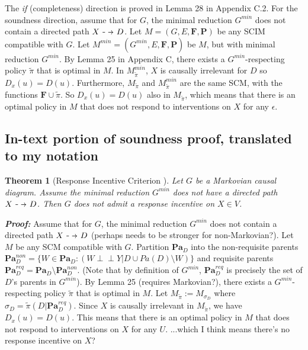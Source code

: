 \documentclass[letterpaper,10pt]{article}
\newtheorem{theorem}{Theorem}
\newcommand\dashto{\mathrel{
  -\mkern-6mu{\to}\mkern-20mu{\color{white}\bullet}\mkern12mu
}}
\newcommand\indep{\perp \!\!\! \perp}
\begin{document}
The \emph{if} (completeness) direction is proved in  Lemma 28 in Appendix C.2. For the soundness direction, assume that for $G$, the minimal reduction $G^{min}$ does not contain a directed path $X\dashto D$. Let $M=(G,E,\mathbf{F},\mathbf{P})$ be any SCIM compatible with $G$. Let $M^{min}=(G^{min},E,\mathbf{F},\mathbf{P})$ be $M$, but with minimal reduction $G^{min}$. By Lemma 25 in Appendix C, there exists a $G^{min}$-respecting policy $\tilde{\pi}$ that is optimal in $M$. In $M^{min}_{\tilde{\pi}}$, $X$ is causally irrelevant for $D$ so $D_x(u) = D(u)$. Furthermore, $M_{\tilde{\pi}}$ and $M^{min}_{\tilde{\pi}}$ are the same SCM, with the functions $\mathbf{F}\cup{\tilde{\pi}}$. So $D_x(u) = D(u)$ also in $M_{\tilde{\pi}}$, which means that there is an optimal policy in $M$ that does not respond to interventions on $X$ for any $\epsilon$.

\subsection{In-text portion of soundness proof, translated to my notation}

\begin{theorem}[Response Incentive Criterion \cite{everitt2021agent}]\label{markov}
Let $G$ be a Markovian causal diagram. Assume the minimal reduction $G^{min}$ does not have a directed path $X\dashto D$.
Then $G$ does not admit a response incentive on $X\in V$.
\end{theorem}

\textbf{\emph{Proof:}}
Assume that for $G$, the minimal reduction $G^{min}$ does not contain a directed path $X\dashto D$ \color{red} (perhaps needs to be stronger for non-Markovian?)\color{black}. 
Let $M$ be any SCM compatible with $G$. 
Partition $\mathbf{Pa}_D$ into the non-requisite parents $\mathbf{Pa}^{non}_D=\{W\in \mathbf{Pa}_D : (W\indep Y | D \cup Pa(D) \setminus W)\}$ and requisite parents $\mathbf{Pa}_D^{req}=\mathbf{Pa}_D\setminus\mathbf{Pa}^{non}_D$.
(Note that by definition of $G^{min}$, $\mathbf{Pa}_D^{req}$ is precisely the set of $D$'s parents in $G^{min}$).
By Lemma 25 \color{red} (requires Markovian?)\color{black}, there exists a $G^{min}$-respecting policy $\tilde{\pi}$ that is optimal in $M$. 
Let $M_{\tilde{\pi}}:=M_{\sigma_D}$ where $\sigma_D = \tilde{\pi} (D|\mathbf{Pa}^{req}_D)$.
Since $X$ is causally irrelevant in $M_{\tilde{\pi}}$, we have $D_x(u) = D(u)$. 
This means that there is an optimal policy in $M$ that does not respond to interventions on $X$ for any $U$.
\color{red} ...which I think means there's no response incentive on $X$? \color{black}
\end{document}
